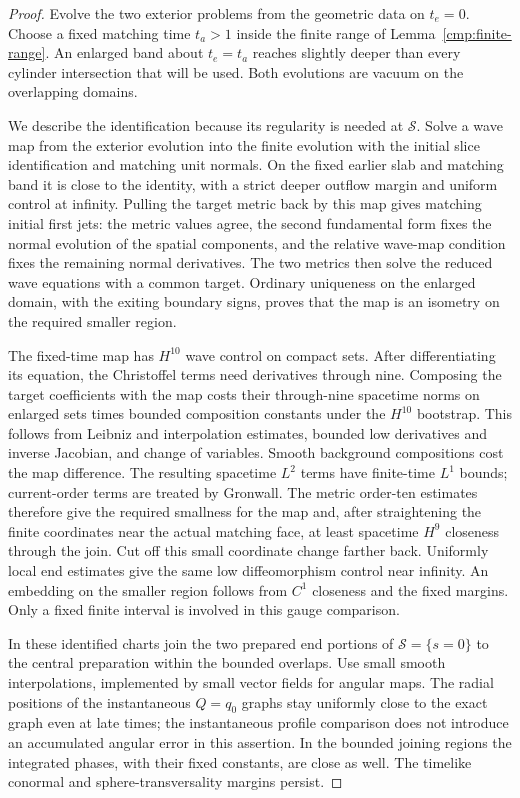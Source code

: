 \begin{proof}
Evolve the two exterior problems from the geometric data on $t_e=0$.
Choose a fixed matching time $t_a>1$ inside the finite range of
Lemma~\ref{cmp:finite-range}. An enlarged band about $t_e=t_a$ reaches
slightly deeper than every cylinder intersection that will be used.
Both evolutions are vacuum on the overlapping domains.

We describe the identification because its regularity is needed at
$\mathcal S$. Solve a wave map from the exterior evolution into the
finite evolution with the initial slice identification and matching
unit normals. On the fixed earlier slab and matching band it is close
to the identity, with a strict deeper outflow margin and uniform control
at infinity. Pulling the target metric back by this map gives matching
initial first jets: the metric values agree, the second fundamental
form fixes the normal evolution of the spatial components, and the
relative wave-map condition fixes the remaining normal derivatives.
The two metrics then solve the reduced wave equations with a common
target. Ordinary uniqueness on the enlarged domain, with the exiting
boundary signs, proves that the map is an isometry on the required
smaller region.

The fixed-time map has $H^{10}$ wave control on compact sets. After
differentiating its equation, the Christoffel terms need derivatives
through nine. Composing the target coefficients with the map costs
their through-nine spacetime norms on enlarged sets times bounded
composition constants under the $H^{10}$ bootstrap. This follows from
Leibniz and interpolation estimates, bounded low derivatives and inverse
Jacobian, and change of variables. Smooth background compositions cost
the map difference. The resulting spacetime $L^2$ terms have finite-time
$L^1$ bounds; current-order terms are treated by Gronwall. The metric
order-ten estimates therefore give the required smallness for the map
and, after straightening the finite coordinates near the actual matching
face, at least spacetime $H^9$ closeness through the join. Cut off this
small coordinate change farther back. Uniformly local end estimates
give the same low diffeomorphism control near infinity. An embedding on
the smaller region follows from $C^1$ closeness and the fixed margins.
Only a fixed finite interval is involved in this gauge comparison.

In these identified charts join the two prepared end portions of
$\mathcal S=\{s=0\}$ to the central preparation within the bounded
overlaps. Use small smooth interpolations, implemented by small vector
fields for angular maps. The radial positions of the instantaneous
$Q=q_0$ graphs stay uniformly close to the exact graph even at late
times; the instantaneous profile comparison does not introduce an
accumulated angular error in this assertion. In the bounded joining
regions the integrated phases, with their fixed constants, are close
as well.
The timelike conormal and sphere-transversality margins persist.


\end{proof}
